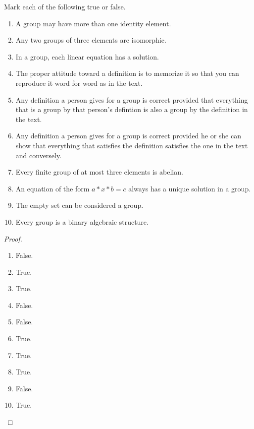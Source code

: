 \begin{exercise}
    Mark each of the following true or false.
    \begin{enumerate}[label={\textbf{\alph*.}}]
        \item A group may have more than one identity element.
        \item Any two groups of three elements are isomorphic.
        \item In a group, each linear equation has a solution.
        \item The proper attitude toward a definition is to memorize it so that you can reproduce it word for word as in the text.
        \item Any definition a person gives for a group is correct provided that everything that is a group by that person's defintion is also a group by the definition in the text.
        \item Any definition a person gives for a group is correct provided he or she can show that everything that satisfies the definition satisfies the one in the text and conversely.
        \item Every finite group of at most three elements is abelian.
        \item An equation of the form $a * x * b = c$ always has a unique solution in a group.
        \item The empty set can be considered a group.
        \item Every group is a binary algebraic structure.
    \end{enumerate}
\end{exercise}

\begin{proof}
    \begin{enumerate}[label={\textbf{\alph*.}}]
        \item False.
        \item True.
        \item True.
        \item False.
        \item False.
        \item True.
        \item True.
        \item True.
        \item False.
        \item True.
    \end{enumerate}
\end{proof}

